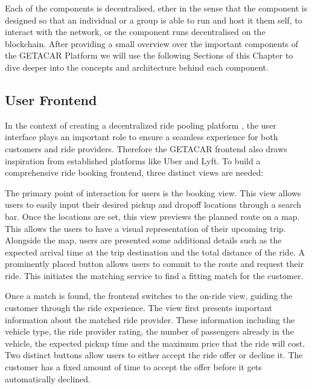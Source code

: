 Each of the components is decentralised, ether in the sense that the component is designed so that an individual or a group is able to run and host it them self, to interact with the network, or the component runs decentralised on the blockchain. After providing a small overview over the important components of the GETACAR Platform we will use the following Sections of this Chapter to dive deeper into the concepts and architecture behind each component. 

\subsection{User Frontend}
In the context of creating a decentralized ride pooling platform , the user interface plays an important role to ensure a seamless experience for both customers and ride providers. Therefore the GETACAR frontend also draws inspiration from established platforms like Uber and Lyft. To build a comprehensive ride booking frontend, three distinct views are needed:

The primary point of interaction for users is the booking view. This view allows users to easily input their desired pickup and dropoff locations through a search bar. Once the locations are set, this view previews the planned route on a map. This allows the users to have a visual representation of their upcoming trip. Alongside the map, users are presented some additional details such as the expected arrival time at the trip destination and the total distance of the ride. A prominently placed button allows users to commit to the route and request their ride. This initiates the matching service to find a fitting match for the customer.

Once a match is found, the frontend switches to the on-ride view, guiding the customer through the ride experience. The view first presents important information about the matched ride provider. These information including the vehicle type, the ride provider rating, the number of passengers already in the vehicle, the expected pickup time and the maximum price that the ride will cost. Two distinct buttons allow users to either accept the ride offer or decline it. The customer has a fixed amount of time to accept the offer before it gets automatically declined. 

